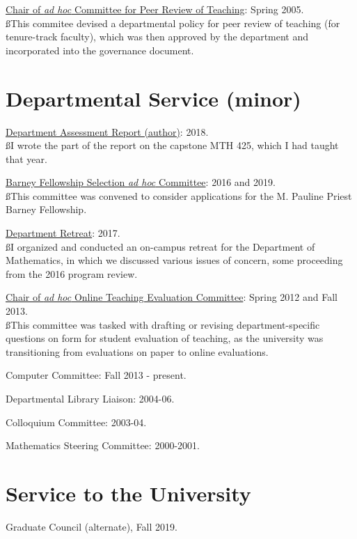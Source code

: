 \documentclass[overlapped,line,letterpaper]{res}
\begin{document}
\begin{resume}
\underline{Chair of {\em ad hoc} Committee for Peer Review of Teaching}: Spring 2005.\\
{\ss This commitee devised a departmental policy for peer review of teaching (for tenure-track faculty), which was then approved by the department and incorporated into the governance document.}


\large
\section{\bf  Departmental Service (minor)}
\vspace{3 mm}
\normalsize

\underline{Department Assessment Report (author)}: 2018. \\
{\ss I wrote the part of the report on the capstone MTH 425, which I had taught that year.}

\underline{Barney Fellowship Selection {\em ad hoc} Committee}: 2016 and 2019. \\
{\ss This committee was convened to consider applications for the M. Pauline Priest Barney Fellowship.}

\underline{Department Retreat}: 2017. \\
{\ss I organized and conducted an on-campus retreat for the Department of Mathematics, in which we discussed various issues of concern, some proceeding from the 2016 program review.}  

\underline{Chair of {\em ad hoc} Online Teaching Evaluation Committee}: Spring 2012 and Fall 2013.\\
{\ss This committee was tasked with drafting or revising department-specific questions on form for student evaluation of teaching, as the university was transitioning from evaluations on paper to online evaluations.}

{Computer Committee}: Fall 2013 - present.

{Departmental Library Liaison}: 2004-06.

{Colloquium Committee}: 2003-04.

{Mathematics Steering Committee}: 2000-2001.

\large
\section{\bf Service to the University}
\vspace{3mm}
\normalsize

Graduate Council (alternate), Fall 2019.


\end{resume}
\end{document}
